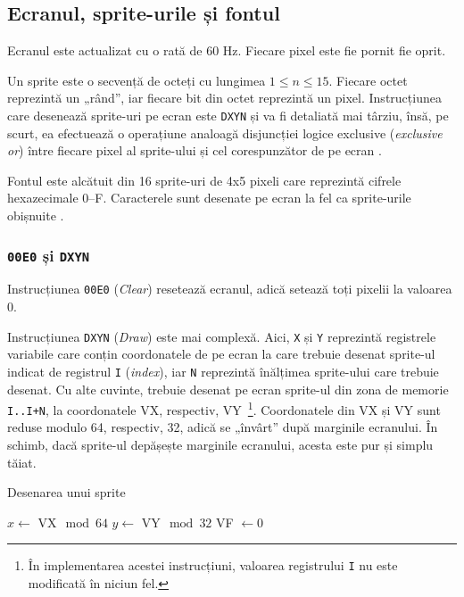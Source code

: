 \documentclass[a4paper]{article}
\begin{document}
\subsection{Ecranul, sprite-urile și fontul}
Ecranul este actualizat cu o rată de 60 Hz. Fiecare pixel este fie pornit fie oprit.

Un sprite este o secvență de octeți cu lungimea $1 \leq n \leq 15$. Fiecare octet reprezintă un „rând”, iar fiecare bit din octet reprezintă
un pixel. Instrucțiunea care desenează sprite-uri pe ecran este \texttt{DXYN} și va fi detaliată mai târziu, însă, pe scurt, ea efectuează o operațiune
analoagă disjuncției logice exclusive (\textit{exclusive or}) între fiecare pixel al sprite-ului și cel corespunzător de pe ecran \cite{langhoff}.

Fontul este alcătuit din 16 sprite-uri de 4x5 pixeli care reprezintă cifrele hexazecimale 0--F. Caracterele sunt desenate pe ecran la fel ca
sprite-urile obișnuite \cite{langhoff}.

\subsubsection{\texttt{00E0} și \texttt{DXYN}}
Instrucțiunea \texttt{00E0} (\textit{Clear}) resetează ecranul, adică setează toți pixelii la valoarea 0.

Instrucțiunea \texttt{DXYN} (\textit{Draw}) este mai complexă. Aici, \texttt{X} și \texttt{Y} reprezintă registrele variabile care conțin coordonatele
de pe ecran la care trebuie desenat sprite-ul indicat de registrul \texttt{I} (\textit{index}), iar \texttt{N} reprezintă înălțimea sprite-ului
care trebuie desenat. Cu alte cuvinte, trebuie desenat pe ecran sprite-ul din zona de memorie \texttt{I..I+N}, la coordonatele VX, respectiv,
VY~\footnote{În implementarea acestei instrucțiuni, valoarea registrului \texttt{I} nu este modificată în niciun fel.}. Coordonatele din VX și VY
sunt reduse modulo 64, respectiv, 32, adică se „învârt” după marginile ecranului. În schimb, dacă sprite-ul depășește marginile ecranului, acesta
este pur și simplu tăiat.

\begin{algorithm}[hbt!]
	\caption{Desenarea unui sprite}\label{alg:dxyn}
	$x\gets$ VX$\mod 64$\;
	$y\gets$ VY$\mod 32$\;
	VF $\gets 0$\;
\end{algorithm}
\end{document}

